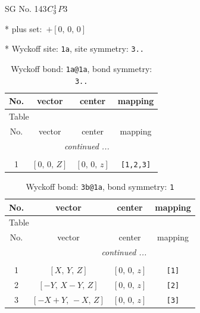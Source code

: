 \documentclass[fleqn,8pt]{jsarticle}
\begin{document}
\setcounter{MaxMatrixCols}{32}

\renewcommand{\tablename}{Table~}
\renewcommand{\figurename}{Figure~}
\begin{center}
\LARGE
SG No. 143\quad$C_{\rm 3}^{1}$\quad$P3$\quad[ trigonal ]
\end{center}

* plus set:\,\,\,$+\left[ 0,\, 0,\, 0 \right]$


* Wyckoff site: {\tt 1a}, site symmetry: {\tt 3..}
\renewcommand{\arraystretch}{1.2}
\begin{longtable}{cccc}
\caption{Wyckoff bond: {\tt 1a@1a}, bond symmetry: {\tt 3..}}
 \\
 \hline \hline
No. & vector & center & mapping \\ \hline \endfirsthead

\multicolumn{3}{l}{\tablename\ \thetable{}} \\
 \hline \hline
No. & vector & center & mapping \\ \hline \endhead

 \hline \hline
\multicolumn{3}{r}{\footnotesize\it continued ...} \\ \endfoot

 \hline \hline
\multicolumn{3}{r}{} \\ \endlastfoot

1 & $\left[ 0,\, 0,\, Z \right]$ & $\left[ 0,\, 0,\, z \right]$ & {\tt [1,2,3]} \\
\end{longtable}
\renewcommand{\arraystretch}{1.2}
\begin{longtable}{cccc}
\caption{Wyckoff bond: {\tt 3b@1a}, bond symmetry: {\tt 1}}
 \\
 \hline \hline
No. & vector & center & mapping \\ \hline \endfirsthead

\multicolumn{3}{l}{\tablename\ \thetable{}} \\
 \hline \hline
No. & vector & center & mapping \\ \hline \endhead

 \hline \hline
\multicolumn{3}{r}{\footnotesize\it continued ...} \\ \endfoot

 \hline \hline
\multicolumn{3}{r}{} \\ \endlastfoot

1 & $\left[ X,\, Y,\, Z \right]$ & $\left[ 0,\, 0,\, z \right]$ & {\tt [1]} \\ \hline
2 & $\left[ - Y,\, X - Y,\, Z \right]$ & $\left[ 0,\, 0,\, z \right]$ & {\tt [2]} \\ \hline
3 & $\left[ - X + Y,\, - X,\, Z \right]$ & $\left[ 0,\, 0,\, z \right]$ & {\tt [3]} \\
\end{longtable}
\end{document}
